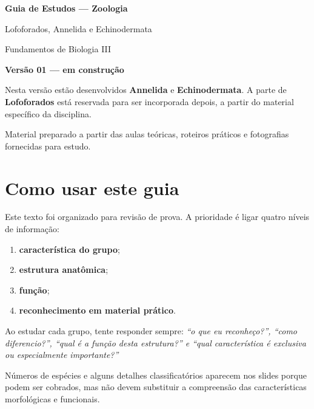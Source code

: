 \documentclass[a4paper,12pt]{article}
\begin{document}
\begin{titlepage}
\centering
\vspace*{2.5cm}
{\Huge\bfseries Guia de Estudos — Zoologia\par}
\vspace{0.8cm}
{\LARGE Lofoforados, Annelida e Echinodermata\par}
\vspace{1.2cm}
{\large Fundamentos de Biologia III\par}
\vfill
\begin{tcolorbox}[colback=gray!5,colframe=gray!45,width=.88\textwidth]
\centering
\textbf{Versão 01 — em construção}\par
\medskip
Nesta versão estão desenvolvidos \textbf{Annelida} e \textbf{Echinodermata}. A parte de \textbf{Lofoforados} está reservada para ser incorporada depois, a partir do material específico da disciplina.
\end{tcolorbox}
\vfill
{\large Material preparado a partir das aulas teóricas, roteiros práticos e fotografias fornecidas para estudo.\par}
\end{titlepage}

\tableofcontents
\newpage

\section{Como usar este guia}

Este texto foi organizado para revisão de prova. A prioridade é ligar quatro níveis de informação:

\begin{enumerate}
  \item \textbf{característica do grupo};
  \item \textbf{estrutura anatômica};
  \item \textbf{função};
  \item \textbf{reconhecimento em material prático}.
\end{enumerate}

Ao estudar cada grupo, tente responder sempre: \emph{``o que eu reconheço?'', ``como diferencio?'', ``qual é a função desta estrutura?'' e ``qual característica é exclusiva ou especialmente importante?''}

\begin{atencao}
Números de espécies e alguns detalhes classificatórios aparecem nos slides porque podem ser cobrados, mas não devem substituir a compreensão das características morfológicas e funcionais.
\end{atencao}
\end{document}

